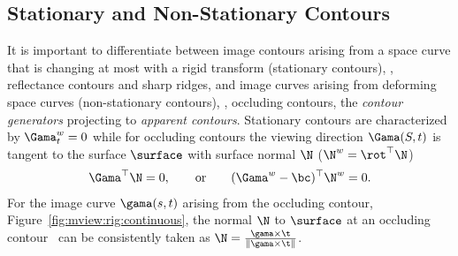 
%
%
%
%

\subsection{Stationary and Non-Stationary Contours}\label{sec:apparent:contour:basics}
It is important to differentiate between image contours arising from a space
curve that is changing at most with a rigid transform (stationary contours),
\eg, reflectance contours and sharp ridges, 
and image curves arising from deforming space curves (non-stationary contours),
\eg, occluding contours,  the \emph{contour
generators} projecting to \emph{apparent contours}.
Stationary contours are characterized by $\Gama_t^w = 0$ while for 
occluding contours 
the viewing direction $\Gama(S,t)$ is tangent to the surface $\surface$ with
surface normal $\N$ ($\N^w = \rot^\top \N$)
\begin{align}\label{eq:occlusion:condition}
\Gama^\top\N = 0,\qquad \text{or}\qquad (\Gama^w-\bc)^\top\N^w = 0.
\end{align}
For the image curve $\gama(s,t)$ arising from 
the occluding contour, Figure~\ref{fig:mview:rig:continuous}, the
normal $\N$ to $\surface$ at an occluding contour~\cite{Giblin:Motion:Book} can
be consistently taken as $\N = \frac{\gama\times\t}{\|\gama\times\t\|}$.

